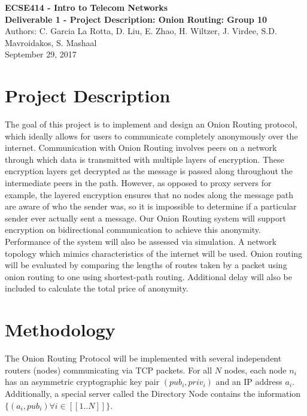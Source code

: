 \documentclass[10pt]{article}
\begin{document}
\noindent
\large \textbf{ECSE414 - Intro to Telecom Networks\\Deliverable 1 - Project Description: Onion Routing: Group 10}\\
Authors: C. Garcia La Rotta, D. Liu, E. Zhao, H. Wiltzer, J. Virdee, S.D. Mavroidakos, S. Mashaal\\
September 29, 2017

\section*{Project Description}

The goal of this project is to implement and design an Onion Routing protocol,
which ideally allows for users to communicate completely anonymously over the
internet. Communication with Onion Routing involves peers on a network through which data is transmitted with multiple layers of encryption. These encryption layers get decrypted as
the message is passed along throughout the intermediate peers in the path.
However, as opposed to proxy servers for example,
the layered encryption ensures that no nodes along the
message path are aware of who the sender was, so it is impossible to determine
if a particular sender ever actually sent a message. Our Onion Routing
system will support encryption on bidirectional communication to achieve this
anonymity.\\

\noindent Performance of the system will also be assessed via simulation. A network topology which mimics characteristics of the internet will be used. Onion routing will be evaluated by comparing the lengths of routes taken by a packet using onion routing to one using shortest-path routing. Additional delay will also be included to calculate the total price of anonymity.


\section*{Methodology}

The Onion Routing Protocol will be implemented with several independent routers (nodes)
communicating via TCP packets.  For all $N$ nodes, each node $n_i$ has
an asymmetric cryptographic key pair $(pub_{i},priv_{i})$ and an IP address $a_i$.  Additionally, a special
server called the Directory Node contains the information $\{(a_i, pub_i) \forall i \in [\![1..N]\!]\}$.\\
\end{document}
